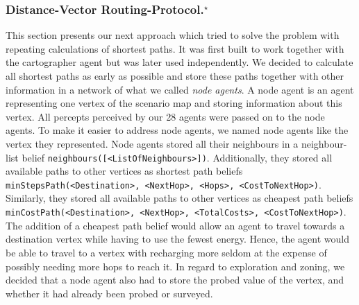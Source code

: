 \subsubsection[Distance-Vector Routing Protocol]{Distance-Vector Routing-Protocol.$^\star$}\label{alg:map_dv}
This section presents our next approach which tried to solve the problem with repeating calculations of shortest paths.
It was first built to work together with the cartographer agent but was later used independently.
We decided to calculate all shortest paths as early as possible and store these paths together with other information in a network of what we called \emph{node agents}.
A node agent is an agent representing one vertex of the scenario map and storing information about this vertex.
All percepts perceived by our 28 agents were passed on to the node agents.
To make it easier to address node agents, we named node agents like the vertex they represented.
Node agents stored all their neighbours in a neighbour-list belief \texttt{neighbours([<ListOfNeighbours>])}.
Additionally, they stored all available paths to other vertices as shortest path beliefs \texttt{minStepsPath(<Destination>, <NextHop>, <Hops>, <CostToNextHop>)}.
Similarly, they stored all available paths to other vertices as cheapest path beliefs \texttt{minCostPath(<Destination>, <NextHop>, <TotalCosts>, <CostToNextHop>)}.
The addition of a cheapest path belief would allow an agent to travel towards a destination vertex while having to use the fewest energy.
Hence, the agent would be able to travel to a vertex with recharging more seldom at the expense of possibly needing more hops to reach it.
In regard to exploration and zoning, we decided that a node agent also had to store the probed value of the vertex, and whether it had already been probed or surveyed.

